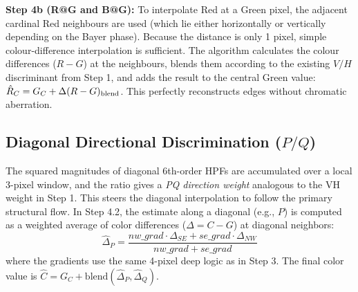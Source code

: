 \documentclass[a4paper,11pt]{article}
\begin{document}
\textbf{Step 4b (R@G and B@G):} To interpolate Red at a Green pixel, the adjacent cardinal Red neighbours are used (which lie either horizontally or vertically depending on the Bayer phase). Because the distance is only 1 pixel, simple colour-difference interpolation is sufficient. The algorithm calculates the colour differences ($R-G$) at the neighbours, blends them according to the existing $V/H$ discriminant from Step 1, and adds the result to the central Green value: $\hat{R}_C = G_C + \Delta(R-G)_{\rm blend}$. This perfectly reconstructs edges without chromatic aberration.

\subsection{Diagonal Directional Discrimination ($P/Q$)}

The squared magnitudes of diagonal 6th-order HPFs are accumulated over a local 3-pixel window, and the ratio gives a \emph{PQ direction weight} analogous to the VH weight in Step 1. This steers the diagonal interpolation to follow the primary structural flow. In Step 4.2, the estimate along a diagonal (e.g., $P$) is computed as a weighted average of color differences ($\Delta = C - G$) at diagonal neighbors:
\[
    \hat{\Delta}_P = \frac{nw\_grad \cdot \Delta_{SE} + se\_grad \cdot \Delta_{NW}}{nw\_grad + se\_grad}
\]
where the gradients use the same 4-pixel deep logic as in Step 3. The final color value is $\hat{C} = G_C + \text{blend}(\hat{\Delta}_P, \hat{\Delta}_Q)$.
\end{document}
